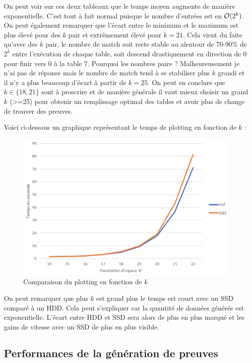 On peut voir sur ces deux tableaux que le temps moyen augmente de manière exponentielle. C'est tout à fait normal puisque le nombre d'entrées est en $\mathcal{O}(2^k)$. On peut également remarquer que l'écart entre le minimum et le maximum est plus élevé pour des $k$ pair et extrêmement élevé pour $k = 21$. Cela vient du faite qu'avec des $k$ pair, le nombre de match soit reste stable au alentour de 70-90\% de $2^k$ entre l'exécution de chaque table, soit descend drastiquement en direction de 0 pour finir vers 0 à la table 7. Pourquoi les nombres paire ? Malheureusement je n'ai pas de réponse mais le nombre de match tend à se stabiliser plus $k$ grandi et il n'y a plus beaucoup d'écart à partir de $k = 25$. On peut en conclure que $k \in \{18,21\}$ sont à proscrire et de manière générale il vaut mieux choisir un grand $k$ (>=25) pour obtenir un remplissage optimal des tables et avoir plus de change de trouver des preuves.

Voici ci-dessous un graphique représentant le temps de plotting en fonction de $k$ :

\begin{figure}[H]
  \centering
  \includegraphics[width=14cm]{images/bench_ssd_hdd.png}
  \caption{Comparaison du plotting en fonction de $k$}
\end{figure}

On peut remarquer que plus $k$ est grand plus le temps est court avec un SSD comparé à un HDD. Cela peut s'expliquer car la quantité de données générée est exponentielle. L'écart entre HDD et SSD sera alors de plus en plus marqué et les gains de vitesse avec un SSD de plus en plus visible.

\subsection{Performances de la génération de preuves}

